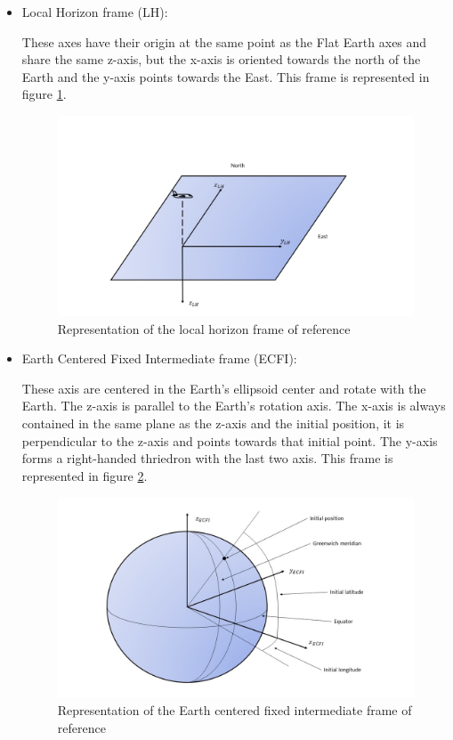 \begin{itemize}
\item Local Horizon frame (LH):

These axes have their origin at the same point as the Flat Earth axes and share the same z-axis, but the x-axis is oriented towards the north of the Earth and the y-axis points towards the East. This frame is represented in figure \ref{fig:LH_frame}.

\begin{figure}
\centering
\includegraphics[scale=0.4]{Images/LH_frame.jpg}
\caption{Representation of the local horizon frame of reference}
\label{fig:LH_frame}
\end{figure} 

\newpage

\item Earth Centered Fixed Intermediate frame (ECFI): 

These axis are centered in the Earth's ellipsoid center and rotate with the Earth. The z-axis is parallel to the Earth's rotation axis. The x-axis is always contained in the same plane as the z-axis and the initial position, it is perpendicular to the z-axis and points towards that initial point. The y-axis forms a right-handed thriedron with the last two axis. This frame is represented in figure \ref{fig:ECFI_frame}.

\begin{figure}
\centering
\includegraphics[scale=0.4]{Images/ECFI_frame.jpg}
\caption{Representation of the Earth centered fixed intermediate frame of reference}
\label{fig:ECFI_frame}
\end{figure}


\end{itemize}
